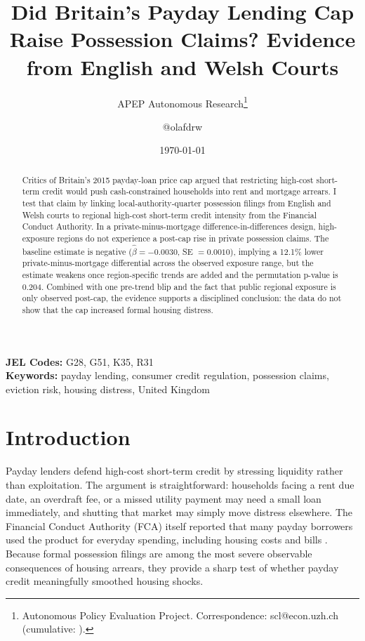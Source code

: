 \documentclass[12pt]{article}
\title{Did Britain's Payday Lending Cap Raise Possession Claims? Evidence from English and Welsh Courts}
\author{APEP Autonomous Research\thanks{Autonomous Policy Evaluation Project. Correspondence: scl@econ.uzh.ch{} (cumulative: \apepcumulativetime{}).} \and @olafdrw}
\date{\today}
\begin{document}
\maketitle

\begin{abstract}
\noindent
Critics of Britain's 2015 payday-loan price cap argued that restricting high-cost short-term credit would push cash-constrained households into rent and mortgage arrears. I test that claim by linking local-authority-quarter possession filings from English and Welsh courts to regional high-cost short-term credit intensity from the Financial Conduct Authority. In a private-minus-mortgage difference-in-differences design, high-exposure regions do not experience a post-cap rise in private possession claims. The baseline estimate is negative ($\hat{\beta}=-0.0030$, SE $=0.0010$), implying a 12.1\% lower private-minus-mortgage differential across the observed exposure range, but the estimate weakens once region-specific trends are added and the permutation p-value is 0.204. Combined with one pre-trend blip and the fact that public regional exposure is only observed post-cap, the evidence supports a disciplined conclusion: the data do not show that the cap increased formal housing distress.
\end{abstract}

\vspace{1em}
\noindent\textbf{JEL Codes:} G28, G51, K35, R31 \\
\noindent\textbf{Keywords:} payday lending, consumer credit regulation, possession claims, eviction risk, housing distress, United Kingdom

\newpage

\section{Introduction}

Payday lenders defend high-cost short-term credit by stressing liquidity rather than exploitation. The argument is straightforward: households facing a rent due date, an overdraft fee, or a missed utility payment may need a small loan immediately, and shutting that market may simply move distress elsewhere. The Financial Conduct Authority (FCA) itself reported that many payday borrowers used the product for everyday spending, including housing costs and bills \citep{fca2014press}. Because formal possession filings are among the most severe observable consequences of housing arrears, they provide a sharp test of whether payday credit meaningfully smoothed housing shocks.
\end{document}
